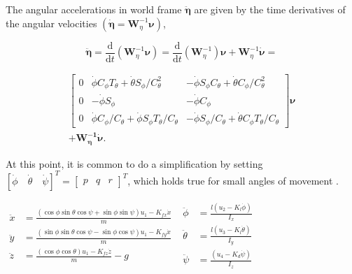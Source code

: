 The angular accelerations in world frame $\ddot{\boldsymbol{\eta}}$ are given by the time derivatives of the angular velocities $\left(\dot{\boldsymbol{\eta}} = \boldsymbol{W}_{\eta}^{-1} \boldsymbol{\nu}\right)$,

$$\ddot{\boldsymbol{\eta}}=\frac{\mathrm{d}}{\mathrm{d} t}\left(\boldsymbol{W}_{\eta}^{-1} \boldsymbol{\nu}\right) =\frac{\mathrm{d}}{\mathrm{d} t}\left(\boldsymbol{W}_{\eta}^{-1}\right) \boldsymbol{\nu}+\boldsymbol{W}_{\eta}^{-1} \dot{\boldsymbol{\nu}} = $$

$$
\begin{array}{c}
\left[ \begin{array}{cccc}{0} & {\dot{\phi} C_{\phi} T_{\theta}+\dot{\theta} S_{\phi} / C_{\theta}^{2}} & {-\dot{\phi} S_{\phi} C_{\theta}+\dot{\theta} C_{\phi} / C_{\theta}^{2}} \\ {0} & {-\dot{\phi} S_{\phi}} & {-\dot{\phi} C_{\phi}} \\ {0} & {\dot{\phi} C_{\phi} / C_{\theta}+\dot{\phi} S_{\phi} T_{\theta} / C_{\theta}} & {-\dot{\phi} S_{\phi} / C_{\theta}+\dot{\theta} C_{\phi} T_{\theta} / C_{\theta}}\end{array}\right] \boldsymbol{\nu}
\\ + \boldsymbol{W_{\eta}^{-1}} \dot{\boldsymbol{\nu}}.
\end{array}
  $$

At this point, it is common to do a simplification by setting $[\dot{\phi} \quad \dot{\theta} \quad \dot{\psi}]^{T}=\left[ \begin{array}{lll}{p} & {q} & {r}\end{array}\right]^{T}$, which holds true for small angles of movement \cite{Sabatino}.

$\begin{aligned} 
 \ddot{x} &=\frac{(\cos \phi \sin \theta \cos \psi+\sin \phi \sin \psi) u_{1}-K_{f x} \dot{x}}{m} \\
 \ddot{y} &=\frac{(\sin \phi \sin \theta \cos \psi-\sin \phi \cos \psi) u_{1}-K_{f y} \dot{x}}{m} \\
 \ddot{z} &=\frac{(\cos \phi \cos \theta) u_{1}-K_{f z} \dot{z}}{m}-g 
\end{aligned}$
$\begin{aligned} \ddot{\phi} &=\frac{l\left(u_{2}-K_{l} \dot{\phi}\right)}{I_{x}} \\ \ddot{\theta} &=\frac{l\left(u_{3}-K_{l} \dot{\theta}\right)}{I_{y}} \\ \ddot{\psi} &=\frac{\left(u_{4}-K_{d} \dot{\psi}\right)}{I_{z}} \end{aligned}$

